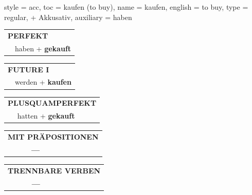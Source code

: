 \begin{verbentry}{
  style = {acc},
  toc = {kaufen (to buy)},
  name = {kaufen},
  english = {to buy},
  type = {regular, + Akkusativ},
  auxiliary = {haben}
}
 \begin{tabular}{rl}
     \multicolumn{2}{l}{\textbf{PERFEKT}}\\
   & haben + \textbf{gekauft}\\
  \end{tabular}
\hfill
   \begin{tabular}{rl}
   
    \multicolumn{2}{l}{\textbf{FUTURE I} }\\
   & werden + \textbf{kaufen}\\
 
  \end{tabular}
\hfill
   \begin{tabular}{rl}
      \multicolumn{2}{l}{\textbf{PLUSQUAMPERFEKT}}\\
   & hatten + \textbf{gekauft}\\
  \end{tabular}
  
  
\vspace{10pt}

\begin{tabular}{lll}
\multicolumn{3}{l}{\textbf{MIT PRÄPOSITIONEN}}\\
& \textbf{---} & \\
\end{tabular}
\hfill
\begin{tabular}{lll}
\multicolumn{3}{l}{\textbf{TRENNBARE VERBEN}}\\
& \textbf{---} & \\
\end{tabular}
\vspace{-5pt}
\end{verbentry}

